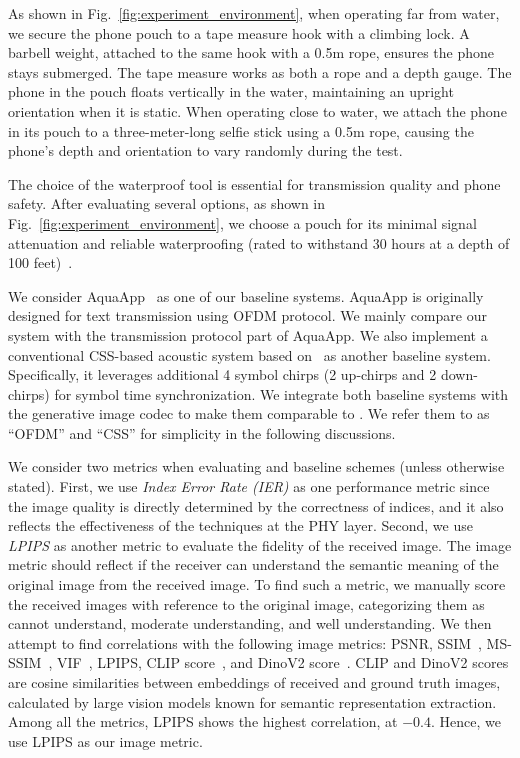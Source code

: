 As shown in Fig.~\ref{fig:experiment_environment},
when operating far from water, we secure the phone pouch to a tape measure hook with a climbing lock. A barbell weight, attached to the same hook with a  0.5m rope, ensures the phone stays submerged. The tape measure works as both a rope and a depth gauge. The phone in the pouch floats vertically in the water, maintaining an upright orientation when it is static.
When operating close to water, we attach the phone in its pouch to a three-meter-long selfie stick using a 0.5m rope, causing the phone's depth and orientation to vary randomly during the test.

The choice of the waterproof tool is essential for transmission quality and phone safety. After evaluating several options, as shown in Fig.~\ref{fig:experiment_environment}, we choose a pouch for its minimal signal attenuation and reliable waterproofing (rated to withstand 30 hours at a depth of 100 feet)~\cite{TORRAS}.







We consider AquaApp~\cite{chen2022underwater} as one of our baseline systems. AquaApp is originally designed for text transmission using OFDM protocol. We mainly compare our system with the transmission protocol part of AquaApp. We also implement a conventional CSS-based acoustic system based on~\cite{TSN23} as another baseline system. Specifically, it leverages additional 4 symbol chirps (2 up-chirps and 2 down-chirps) for symbol time synchronization.
We integrate both baseline systems with the generative image codec to make them comparable to \sysname. We refer them to as ``OFDM'' and ``CSS'' for simplicity in the following discussions.

We consider two metrics when evaluating \sysname and baseline schemes (unless otherwise stated).
First, we use \textit{Index Error Rate (IER)} as one performance metric since the image quality is directly determined by the correctness of indices, and it also reflects the effectiveness of the techniques at the PHY layer.
Second, we use \textit{LPIPS} as another metric to evaluate the fidelity of the received image. The image metric should reflect if the receiver can understand the semantic meaning of the original image from the received image.
To find such a metric, we manually score the received images with reference to the original image, categorizing them as cannot understand, moderate understanding, and well understanding. We then attempt to find correlations with the following image metrics: PSNR, SSIM~\cite{hore2010image}, MS-SSIM~\cite{wang2003multiscale}, VIF~\cite{sheikh2005visual}, LPIPS, CLIP score~\cite{radford2021learning}, and DinoV2 score~\cite{oquab2023dinov2}. CLIP and DinoV2 scores are cosine similarities between embeddings of received and ground truth images, calculated by large vision models known for semantic representation extraction. Among all the metrics, LPIPS shows the highest correlation, at $-0.4$. Hence, we use LPIPS as our image metric.






